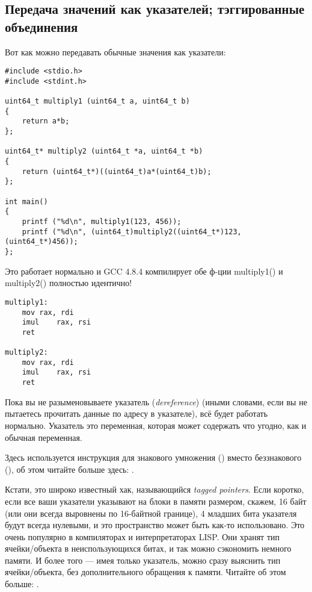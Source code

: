 \subsection{Передача значений как указателей; тэггированные объединения}

Вот как можно передавать обычные значения как указатели:

\begin{lstlisting}[label=unsigned_multiply_C,style=customc]
#include <stdio.h>
#include <stdint.h>

uint64_t multiply1 (uint64_t a, uint64_t b)
{
	return a*b;
};

uint64_t* multiply2 (uint64_t *a, uint64_t *b)
{
	return (uint64_t*)((uint64_t)a*(uint64_t)b);
};

int main()
{
	printf ("%d\n", multiply1(123, 456));
	printf ("%d\n", (uint64_t)multiply2((uint64_t*)123, (uint64_t*)456));
};
\end{lstlisting}

Это работает нормально и GCC 4.8.4 компилирует обе ф-ции multiply1() и multiply2() полностью идентично!

\begin{lstlisting}[label=unsigned_multiply_lst,style=customasmx86]
multiply1:
	mov	rax, rdi
	imul	rax, rsi
	ret

multiply2:
	mov	rax, rdi
	imul	rax, rsi
	ret
\end{lstlisting}

Пока вы не разыменовываете указатель (\emph{dereference}) (иными словами, если вы не пытаетесь прочитать данные
по адресу в указателе), всё будет работать нормально.
Указатель это переменная, которая может содержать что угодно, как и обычная переменная.

Здесь используется инструкция для знакового умножения (\IMUL) вместо беззнакового (\MUL), об этом читайте больше здесь:
.

Кстати, это широко известный хак, называющийся \emph{tagged pointers}.
Если коротко, если все ваши указатели указывают на блоки в памяти размером, скажем, 16 байт (или они всегда
выровнены по 16-байтной границе), 4 младших бита указателя будут всегда нулевыми, и это пространство может быть
как-то использовано.
Это очень популярно в компиляторах и интерпретаторах LISP.
Они хранят тип ячейки/объекта в неиспользующихся битах, и так можно сэкономить немного памяти.
И более того --- имея только указатель, можно сразу выяснить тип ячейки/объекта, без дополнительного обращения к памяти.
Читайте об этом больше: .


